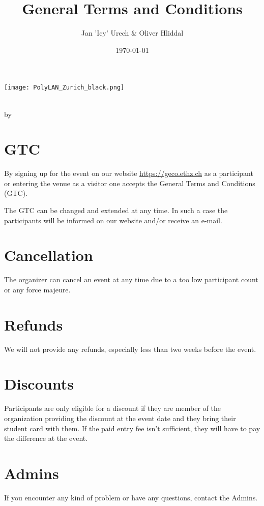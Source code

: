 \documentclass{article}
\title{General Terms and Conditions}
\author{Jan 'Icy' Urech \& Oliver Hliddal}
\date{\today}
\begin{document}
\makeatletter
\begin{titlepage}
\centering
    \texttt{[image: PolyLAN\_Zurich\_black.png]}\\
\begin{figure}
    \centering

    
    
\end{figure}
\LARGE \@title\\ \normalsize by \@author\\ \@date
\end{titlepage}
\makeatother


\clearpage

\tableofcontents
\clearpage


\section{GTC}
By signing up for the event on our website \url{https://geco.ethz.ch} as a participant or entering the venue as a visitor one accepts the General Terms and Conditions (GTC).

The GTC can be changed and extended at any time. In such a case the participants will be informed on our website and/or receive an e-mail.


\section{Cancellation}
The organizer can cancel an event at any time due to a too low participant count or any force majeure.

\section{Refunds}
We will not provide any refunds, especially less than two weeks before the event.

\section{Discounts}
Participants are only eligible for a discount if they are member of the organization providing the discount at the event date and they bring their student card with them. If the paid entry fee isn't sufficient, they will have to pay the difference at the event.

\section{Admins}
If you encounter any kind of problem or have any questions, contact the Admins.
\end{document}

